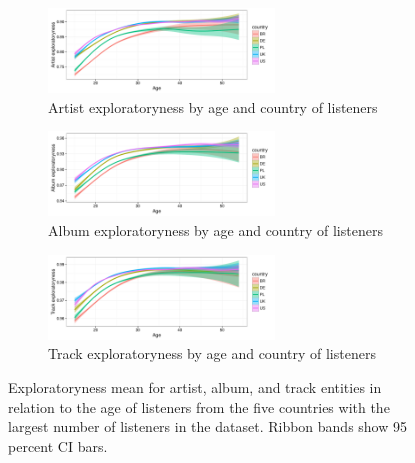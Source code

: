 \graphicspath{{./figs/ch6/}}
\begin{figure}[!t]
	\centering
	\begin{subfigure}[b]{\textwidth}
		\centering
		\includegraphics[width=0.66\textwidth]{artist_exploratoryness_by_country.pdf}
        \caption{Artist exploratoryness by age and country of listeners}
        \label{fig:artist_exploratoryness_by_age_and_gender}
	\end{subfigure}

	\begin{subfigure}[b]{\textwidth}
		\centering
		\includegraphics[width=0.66\textwidth]{album_exploratoryness_by_country.pdf}
        \caption{Album exploratoryness by age and country of listeners}
        \label{fig:album_exploratoryness_by_age_and_gender}
	\end{subfigure}

	\begin{subfigure}[b]{\textwidth}
		\centering
		\includegraphics[width=0.66\textwidth]{track_exploratoryness_by_country.pdf}
        \caption{Track exploratoryness by age and country of listeners}
        \label{fig:track_exploratoryness_by_age_and_gender}
	\end{subfigure}

\caption[Artist, album, and track exploratoryness means versus age of listeners]{Exploratoryness mean for artist, album, and track entities in relation to the age of listeners from the five countries with the largest number of listeners in the dataset. Ribbon bands show 95 percent CI bars.}
\label{fig:artist_exploratoryness_by_country}
\end{figure}





